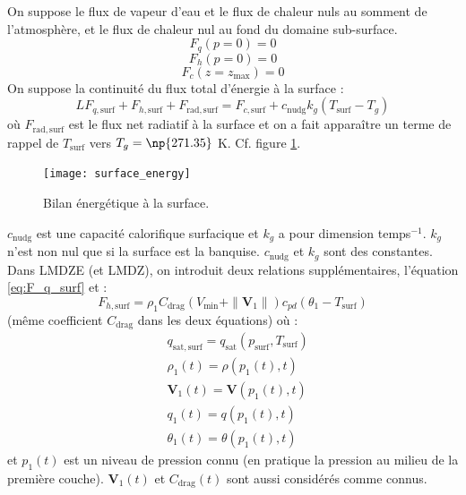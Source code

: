 \documentclass[a4paper,english,french]{article}
\begin{document}
On suppose le flux de vapeur d'eau et le flux de chaleur nuls au
somment de l'atmosphère, et le flux de chaleur nul au fond du domaine
sub-surface.
\begin{equation*}
  F_q(p = 0) = 0
\end{equation*}
\begin{equation*}
  F_h(p = 0) = 0
\end{equation*}
\begin{equation*}
  F_c(z = z_\mathrm{max}) = 0
\end{equation*}
On suppose la continuité du flux total d'énergie à la surface :
\begin{equation}
  \label{eq:surf_energy}
  L F_{q, \mathrm{surf}} + F_{h, \mathrm{surf}} + F_{\mathrm{rad,surf}}
  = F_{c, \mathrm{surf}} + c_\mathrm{nudg} k_g (T_\mathrm{surf} - T_g)
\end{equation}
où $F_{\mathrm{rad,surf}}$ est le flux net radiatif à la surface et on
a fait apparaître un terme de rappel de $T_\mathrm{surf}$ vers
$T_g = \np{271.35}$ K. Cf. figure \ref{fig:surface_energy}.
\begin{figure}
  \centering
  \texttt{[image: surface\_energy]}
  \caption{Bilan énergétique à la surface.}
  \label{fig:surface_energy}
\end{figure}
$c_\mathrm{nudg}$ est une capacité calorifique
surfacique et $k_g$ a pour dimension temps$^{-1}$. $k_g$ n'est non nul
que si la surface est la banquise. $c_\mathrm{nudg}$ et $k_g$ sont des
constantes. Dans LMDZE (et LMDZ), on introduit deux relations
supplémentaires, l'équation \ref{eq:F_q_surf} et :
\begin{equation}
  \label{eq:F_theta_surf}
  F_{h, \mathrm{surf}}
  = \rho_1 C_\mathrm{drag} (V_\mathrm{min} + \| \mathbf{V}_1 \|) c_{pd}
  (\theta_1 - T_\mathrm{surf})
\end{equation}
(même coefficient $C_\mathrm{drag}$ dans les deux équations) où :
\begin{align*}
  & q_\mathrm{sat,surf} = q_\mathrm{sat}(p_\mathrm{surf}, T_\mathrm{surf}) \\
  & \rho_1(t) = \rho(p_1(t), t) \\
  & \mathbf{V}_1(t) = \mathbf{V}(p_1(t), t) \\
  & q_1(t) = q(p_1(t), t) \\
  & \theta_1(t) = \theta(p_1(t), t)
\end{align*}
et $p_1(t)$ est un niveau de pression connu (en pratique la pression
au milieu de la première couche). $\mathbf{V}_1(t)$ et
$C_\mathrm{drag}(t)$ sont aussi considérés comme connus.
\end{document}
